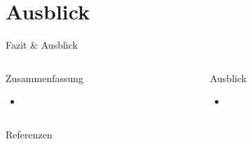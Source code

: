 \documentclass{beamer}
\newcommand{\stichpunkt}[1]{\begin{itemize} \item #1 \end{itemize}}
\begin{document}
%
	\section{Ausblick}
%
		\begin{frame}{Fazit \& Ausblick}
			\begin{columns}
				\begin{column}{0.46\textwidth}
					\begin{alertblock}{Zusammenfassung}%
						\stichpunkt{}%
					\end{alertblock}
				\end{column}
				\begin{column}{0.46\textwidth}
					\begin{exampleblock}{Ausblick}%
						\stichpunkt{}%
					\end{exampleblock}
				\end{column}
			\end{columns}
		\end{frame}
%
		\begin{frame}
		\end{frame}

		\begin{frame}{Referenzen}
			\begin{columns}
				\begin{column}{0.1\textwidth}
				\end{column}
				\begin{column}{0.75\textwidth}
					\printbibliography
				\end{column}
			\end{columns}
		\end{frame}























\end{document}
